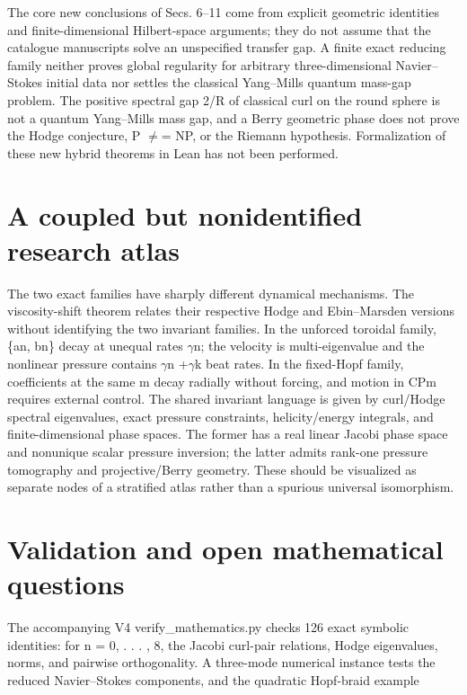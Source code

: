 \documentclass[10pt,letterpaper]{article}
\theoremstyle{remark}
\begin{document}
The core new conclusions of Secs. 6–11 come from explicit geometric identities and finite-dimensional Hilbert-space arguments; they do not assume that the catalogue manuscripts solve an unspecified transfer gap. A finite exact reducing family neither proves global regularity for arbitrary three-dimensional Navier–Stokes initial data nor settles the classical Yang–Mills quantum mass-gap problem. The positive spectral gap 2/R of classical curl on the round sphere is not a quantum Yang–Mills mass gap, and a Berry geometric phase does not prove the Hodge conjecture, P \(\ne \)= NP, or the Riemann hypothesis. Formalization of these new hybrid theorems in Lean has not been performed.


\section{A coupled but nonidentified research atlas}

The two exact families have sharply different dynamical mechanisms. The viscosity-shift theorem relates their respective Hodge and Ebin–Marsden versions without identifying the two invariant families. In the unforced toroidal family, \{an, bn\} decay at unequal rates \(\gamma \)n; the velocity is multi-eigenvalue and the nonlinear pressure contains \(\gamma \)n +\(\gamma \)k beat rates. In the fixed-Hopf family, coefficients at the same m decay radially without forcing, and motion in CPm requires external control. The shared invariant language is given by curl/Hodge spectral eigenvalues, exact pressure constraints, helicity/energy integrals, and finite-dimensional phase spaces. The former has a real linear Jacobi phase space and nonunique scalar pressure inversion; the latter admits rank-one pressure tomography and projective/Berry geometry. These should be visualized as separate nodes of a stratified atlas rather than a spurious universal isomorphism.


\section{Validation and open mathematical questions}

The accompanying V4 verify\_mathematics.py checks 126 exact symbolic identities: for n = 0, . . . , 8, the Jacobi curl-pair relations, Hodge eigenvalues, norms, and pairwise orthogonality. A three-mode numerical instance tests the reduced Navier–Stokes components, and the quadratic Hopf-braid example
\end{document}
